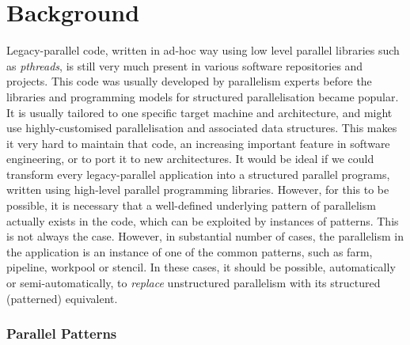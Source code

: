 \section{Background}
Legacy-parallel code, written in ad-hoc way using low level parallel libraries such as \emph{pthreads}, is still very much present in various software repositories and projects. This code was usually developed by parallelism experts before the libraries and programming models for structured parallelisation became popular. It is usually tailored to one specific target machine and architecture, and might use highly-customised parallelisation and associated data structures. This makes it very hard to maintain that code, an increasing important feature in software engineering, or to port it to new architectures. It would be ideal if we could transform every legacy-parallel application into a structured parallel programs, written using high-level parallel programming libraries. However, for this to be possible, it is necessary that a well-defined underlying pattern of parallelism actually exists in the code, which can be exploited by instances of patterns. This is not always the case. However, in substantial number of cases, the parallelism in the application is an instance of one of the common patterns, such as farm, pipeline, workpool or stencil. In these cases, it should be possible, automatically or semi-automatically, to \emph{replace} unstructured parallelism with its structured (patterned) equivalent.   

\subsubsection*{Parallel Patterns}



